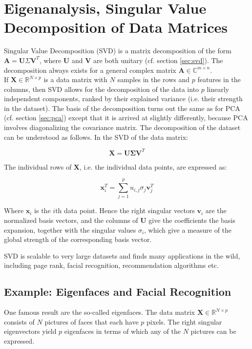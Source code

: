 \section{Eigenanalysis, Singular Value Decomposition of Data Matrices}
\label{sec:datasvd}

Singular Value Decomposition (SVD) is a matrix decomposition of the form $\mathbf{A}=\mathbf{U}\Sigma\mathbf{V}^T$, where $\mathbf{U}$ and $\mathbf{V}$ are both unitary (cf. section \ref{sec:svd}). The decomposition always exists for a general complex matrix $\mathbf{A}\in\mathbb{C}^{m\times n}$. 
\\

If $\mathbf{X}\in\mathbb{R}^{N\times p}$ is a data matrix with $N$ samples in the rows and $p$ features in the columns, then SVD allows for the decomposition of the data into $p$ linearly independent components, ranked by their explained variance (i.e. their strength in the dataset). The basis of the decomposition turns out the same as for PCA (cf. section \ref{sec:pca}) except that it is arrived at slightly differently, because PCA involves diagonalizing the covariance matrix. The decomposition of the dataset can be understood as follows. In the SVD of the data matrix: 

\begin{equation}
\mathbf{X} = \mathbf{U}\mathbf{\Sigma}\mathbf{V}^T
\end{equation}

The individual rows of $\mathbf{X}$, i.e. the individual data points, are expressed as:

\begin{equation}
\mathbf{x}^T_i = \sum_{j=1}^p u_{i,j}\sigma_j\mathbf{v}_j^T
\end{equation}

Where $\mathbf{x}_i$ is the $i$th data point. Hence the right singular vectors $\mathbf{v}_i$ are the normalized basis vectors, and the columns of $\mathbf{U}$ give the coefficients the basis expansion, together with the singular values $\sigma_i$, which give a measure of the global strength of the corresponding basis vector. 

SVD is scalable to very large datasets and finds many applications in the wild, including page rank, facial recognition, recommendation algorithms etc. 


\subsection{Example: Eigenfaces and Facial Recognition}
One famous result are the so-called eigenfaces. The data matrix $\mathbf{X}\in\mathbb{R}^{N\times p}$ consists of $N$ pictures of faces that each have $p$ pixels. The right singular eigenvectors yield $p$ eigenfaces in terms of which any of the $N$ pictures can be expressed. 

